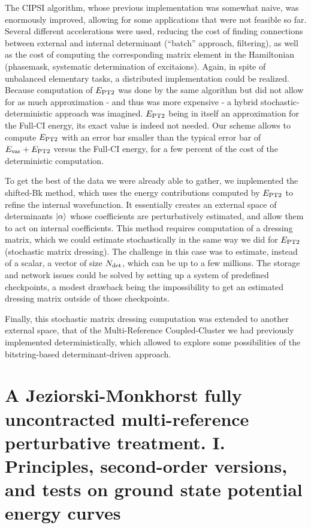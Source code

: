\documentclass[12pt,a4paper]{report}
\begin{document}
The CIPSI algorithm, whose previous implementation was somewhat naive, was enormously improved, allowing for some applications that were not feasible so far\cite{Scemama_2018,1806.05115}. Several different accelerations were used, reducing the cost of finding connections between external and internal determinant (``batch'' approach, filtering), as well as the cost of computing the corresponding matrix element in the Hamiltonian (phasemask, systematic determination of excitaions). Again, in spite of unbalanced elementary tasks, a distributed implementation could be realized.
Because computation of $E_\text{PT2}$ was done by the same algorithm but did not allow for as much approximation - and thus was more expensive - a hybrid stochastic-deterministic approach was imagined. $E_\text{PT2}$ being in itself an approximation for the Full-CI energy, its exact value is indeed not needed. Our scheme allows to compute $E_\text{PT2}$ with an error bar smaller than the typical error bar of $E_{\text{var}} + E_\text{PT2}$ versus the Full-CI energy, for a few percent of the cost of the deterministic computation.

To get the best of the data we were already able to gather, we implemented the shifted-Bk method, which uses the energy contributions computed by $E_\text{PT2}$ to refine the internal wavefunction. It essentially creates an external space of determinants ${\ket{\alpha}}$ whose coefficients are perturbatively estimated, and allow them to act on internal coefficients. This method requires computation of a dressing matrix, which we could estimate stochastically in the same way we did for $E_\text{PT2}$ (stochastic matrix dressing).
The challenge in this case was to estimate, instead of a scalar, a vector of size ${N_\text{det}}$, which can be up to a few millions. The storage and network issues could be solved by setting up a system of predefined checkpoints, a modest drawback being the impossibility to get an estimated dressing matrix outside of those checkpoints.

Finally, this stochastic matrix dressing computation was extended to another external space, that of the Multi-Reference Coupled-Cluster we had previously implemented deterministically,\cite{Garniron_2017} which allowed to explore some possibilities of the bitstring-based determinant-driven approach.


\appendix

\chapter{A Jeziorski-Monkhorst fully uncontracted multi-reference perturbative treatment. I. Principles, second-order versions, and tests on ground state potential energy curves}\cite{Giner_2017}





%
\end{document}
